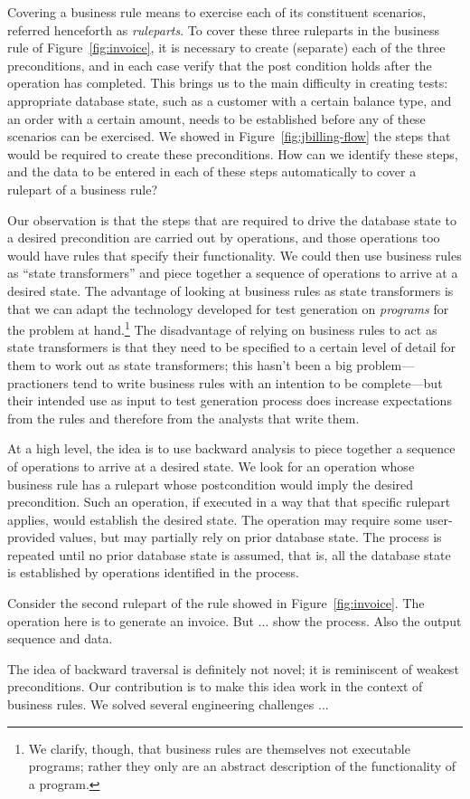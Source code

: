 Covering a business rule means to exercise each of its constituent scenarios, referred henceforth as \textit{ruleparts}.
To cover these three ruleparts in the business rule of Figure~\ref{fig:invoice}, it is necessary to create (separate)
each of the three preconditions, and in each case verify that the post condition holds after the operation has completed.  
This brings us to the main difficulty in creating tests:  appropriate database state, such as a customer with a certain 
balance type, and an order with a certain amount, needs to be established before any of these scenarios can be exercised.  
We showed in Figure~\ref{fig:jbilling-flow} the steps that would be required to create these preconditions.   How can we
identify these steps, and the data to be entered in each of these steps automatically to cover a rulepart of
a business rule?

Our observation is that the steps that are required to drive the database state to a desired precondition are
carried out by operations, and those operations too would have rules that specify their functionality.  We could
then use business rules as ``state transformers'' and piece together a sequence of operations to arrive at
a desired state.  The advantage of looking at business rules as state transformers is that we can adapt the
technology developed for test generation on \textit{programs} for the problem at hand.\footnote{\small We clarify, 
though, that business rules are themselves not executable programs; rather they only are an abstract description 
of the functionality of a program.}  The disadvantage of relying on business rules to act as state transformers is that
they need to be specified to a certain level of detail for them to work out as state transformers; this hasn't
been a big problem---practioners tend to write business rules with an intention to be complete---but their intended
use as input to test generation process does increase expectations from the rules and therefore from the analysts
that write them.

At a high level, the idea is to use backward analysis to piece together a sequence of operations to arrive at 
a desired state.  We look for an operation whose business rule has a rulepart whose postcondition would imply the 
desired precondition.  Such an operation, if executed in a way that that specific rulepart applies, would establish 
the desired state.  The operation may require some user-provided values, but may partially rely on prior database
state. The process is repeated until no prior database state is assumed, that is, all the database state is 
established by operations identified in the process.  

Consider the second rulepart of the rule showed in Figure~\ref{fig:invoice}. The operation here is to generate
an invoice.  But  ... show the process. Also the output sequence and data.


The idea of backward traversal is definitely not novel; it is reminiscent of weakest preconditions.  Our
contribution is to make this idea work in the context of business rules.  We solved several engineering 
challenges ...

